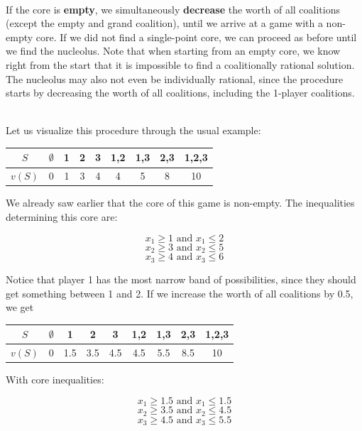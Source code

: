 \documentclass[12pt]{article}
\begin{document}
\noindent
\\
If the core is \textbf{empty}, we simultaneously \textbf{decrease} the worth of all coalitions (except the empty and grand coalition), until we arrive at a game with a non-empty core.
If we did not find a single-point core, we can proceed as before until we find the nucleolus.
Note that when starting from an empty core, we know right from the start that it is impossible to find a coalitionally rational solution.
The nucleolus may also not even be individually rational, since the procedure starts by decreasing the worth of all coalitions, including the 1-player coalitions.

\noindent
\\
Let us visualize this procedure through the usual example:

\begin{table}[h]
    \centering
    \begin{tabular}{|c|cccccccc|}
    \hline
    $S$ & $\emptyset$ & 1 & 2 & 3 & 1,2 & 1,3 & 2,3 & 1,2,3 \\ \hline
    $v(S)$ & 0 & 1 & 3 & 4 & 4 & 5 & 8 & 10 \\ \hline
    \end{tabular}
\end{table}

\noindent
We already saw earlier that the core of this game is non-empty.
The inequalities determining this core are:

\[ x_1 \geq 1 \text{ and } x_1 \leq 2 \]
\[ x_2 \geq 3 \text{ and } x_2 \leq 5 \]
\[ x_3 \geq 4 \text{ and } x_3 \leq 6 \]

\noindent
Notice that player 1 has the most narrow band of possibilities, since they should get something between 1 and 2.
If we increase the worth of all coalitions by 0.5, we get

\begin{table}[h]
    \centering
    \begin{tabular}{|c|cccccccc|}
    \hline
    $S$ & $\emptyset$ & 1 & 2 & 3 & 1,2 & 1,3 & 2,3 & 1,2,3 \\ \hline
    $v(S)$ & 0 & 1.5 & 3.5 & 4.5 & 4.5 & 5.5 & 8.5 & 10 \\ \hline
    \end{tabular}
\end{table}

\noindent
With core inequalities:

\[ x_1 \geq 1.5 \text{ and } x_1 \leq 1.5 \]
\[ x_2 \geq 3.5 \text{ and } x_2 \leq 4.5 \]
\[ x_3 \geq 4.5 \text{ and } x_3 \leq 5.5 \]
\end{document}
